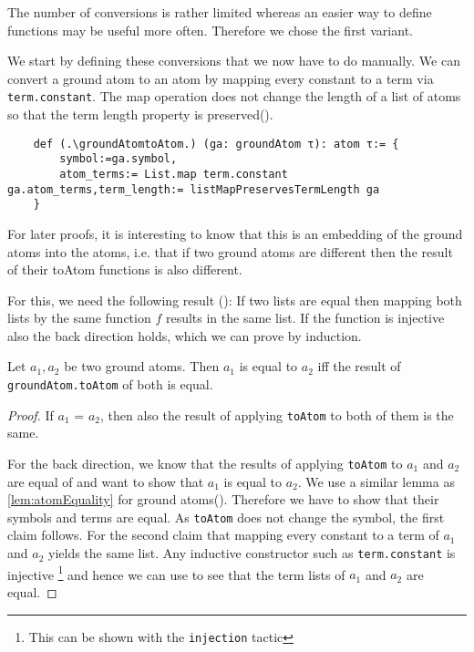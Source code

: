 The number of conversions is rather limited whereas an easier way to define functions may be useful more often. Therefore we chose the first variant. 

We start by defining these conversions that we now have to do manually. We can convert a ground atom to an atom by mapping every constant to a term via \lstinline|term.constant|. The map operation does not change the length of a list of atoms so that the term length property is preserved(\listMapPreservesTermLength).

\begin{lstlisting}
    def (.\groundAtomtoAtom.) (ga: groundAtom τ): atom τ:= {
        symbol:=ga.symbol, 
        atom_terms:= List.map term.constant ga.atom_terms,term_length:= listMapPreservesTermLength ga
    }
\end{lstlisting}

For later proofs, it is interesting to know that this is an embedding of the ground atoms into the atoms, i.e. that if two ground atoms are different then the result of their toAtom functions is also different.

For this, we need the following result (\listMapInjectiveEquality): If two lists are equal then mapping both lists by the same function $f$ results in the same list. If the function is injective also the back direction holds, which we can prove by induction.

\begin{lemma}[\groundAtomToAtomEquality]
    Let $a_1, a_2$ be two ground atoms. Then $a_1$ is equal to $a_2$ iff the result of \lstinline|groundAtom.toAtom| of both is equal.
\end{lemma}
\begin{proof}
    If $a_1$ = $a_2$, then also the result of applying \lstinline|toAtom| to both of them is the same.

    For the back direction, we know that the results of applying \lstinline|toAtom| to $a_1$ and $a_2$ are equal of and want to show that $a_1$ is equal to $a_2$. We use a similar lemma as \cref{lem:atomEquality} for ground atoms(\groundAtomEquality). Therefore we have to show that their symbols and terms are equal. As \lstinline|toAtom| does not change the symbol, the first claim follows. For the second claim that mapping every constant to a term of $a_1$ and $a_2$ yields the same list. Any inductive constructor such as \lstinline|term.constant| is injective \footnote{This can be shown with the \lstinline|injection| tactic} and hence we can use \listMapInjectiveEquality to see that the term lists of $a_1$ and $a_2$ are equal.
\end{proof}

